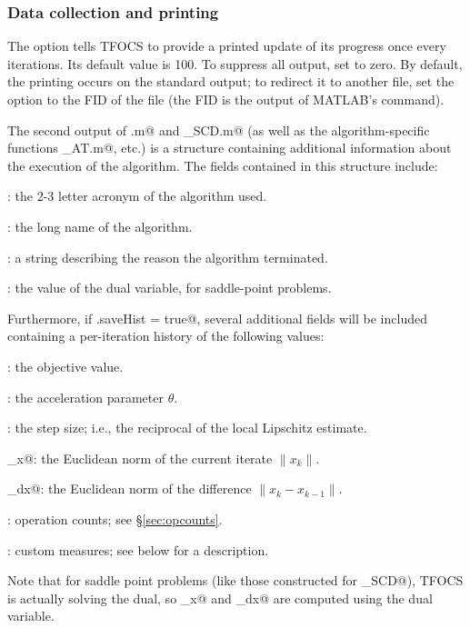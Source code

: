 \documentclass{article}
\newcommand{\<}{\langle}
\renewcommand{\>}{\rangle}
\begin{document}
\subsubsection{Data collection and printing}
\label{sec:data}

The \verb@printEvery@ option tells TFOCS to provide a printed  update
of its progress once every \verb@printEvery@ iterations. Its default
value is 100. To suppress all output, set \verb@printEvery@ to zero.
By default, the printing occurs on the standard output; to redirect
it to another file, set the \verb@fid@ option to the FID of the
file (the FID is the output of MATLAB's \verb@fopen@ command).

The second output \verb@out@ of \verb@tfocs.m@ and \verb@tfocs_SCD.m@ (as well
as the algorithm-specific functions \verb@tfocs_AT.m@, etc.) is a structure
containing additional information about the execution of the algorithm.
The fields contained in this structure include:
\begin{trivlist}
\item \verb@alg@: the 2-3 letter acronym of the algorithm used.
\item \verb@algorithm@: the long name of the algorithm.
\item \verb@status@: a string describing the reason the algorithm terminated.
\item \verb@dual@: the value of the dual variable, for saddle-point problems.
\end{trivlist}
Furthermore, if \verb@opts.saveHist = true@, several additional fields
will be included containing a per-iteration history of the following values:
\begin{trivlist}
\item \verb@f@: the objective value.
\item \verb@theta@: the acceleration parameter $\theta$.
\item \verb@stepsize@: the step size; i.e., the reciprocal of the local Lipschitz estimate.
\item \verb@norm_x@: the Euclidean norm of the current iterate $\|x_k\|$.
\item \verb@norm_dx@: the Euclidean norm of the difference $\|x_k-x_{k-1}\|$.
\item \verb@counts@: operation counts; see \S\ref{sec:opcounts}.
\item \verb@err@: custom measures; see below for a description.
\end{trivlist}
Note that for saddle point problems (like those constructed for
\verb@tfocs_SCD@), TFOCS is actually solving the dual, so
\verb@norm_x@ and \verb@norm_dx@ are computed using the dual variable.
\end{document}
